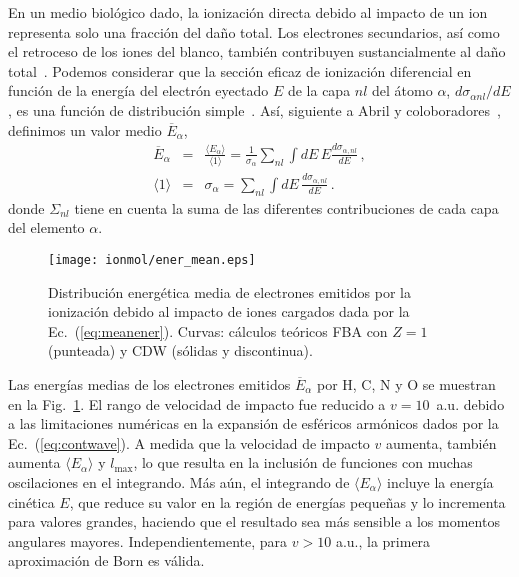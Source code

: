 En un medio biológico dado, la ionización directa debido al impacto de un 
ion representa solo una fracción del daño total. Los electrones 
secundarios, así como el retroceso de los iones del blanco, también 
contribuyen sustancialmente al daño total~\cite{Denifl:11}. Podemos 
considerar que la sección eficaz de ionización diferencial en función de 
la energía del electrón eyectado $E$ de la capa $nl$ del átomo $\alpha$,
$d\sigma_{\alpha nl}/dE$, es una función de distribución simple~\cite{Surdutovic:18}. Así, siguiente a Abril y 
coloboradores~\cite{Abril:15}, definimos un valor medio 
$\overline{E}_{\alpha}$, 
\begin{eqnarray}
\overline{E}_{\alpha} &=&\frac{\langle E_{\alpha}\rangle}{\langle
1\rangle}=\frac{1}{\sigma_{\alpha}}\sum\limits_{nl}\int dE\,E
\frac{d\sigma_{\alpha,nl}}{dE}\,,  
\label{eq:meanener} \\
\langle 1\rangle &=&\sigma_{\alpha}=\sum\limits_{nl}\int dE\,
\frac{d\sigma_{\alpha,nl}}{dE}\,. 
\label{eq:normener}
\end{eqnarray}
donde $\Sigma_{nl}$ tiene en cuenta la suma de las diferentes 
contribuciones de cada capa del elemento $\alpha$.

\begin{figure}
\centering
\texttt{[image: ionmol/ener\_mean.eps]}
\caption[Distribución energética media de electrones emitidos.]
{Distribución energética media de electrones emitidos por la ionización 
debido al impacto de iones cargados dada por la Ec.~(\ref{eq:meanener}). 
Curvas: cálculos teóricos FBA con $Z=1$ (punteada) y CDW (sólidas y 
discontinua).}
\label{fig:emittedener}
\end{figure} 

Las energías medias de los electrones emitidos $\overline{E}_{\alpha}$ 
por H, C, N y O se muestran en la Fig.~\ref{fig:emittedener}. El rango 
de velocidad de impacto fue reducido a $v=10$~a.u. debido a las 
limitaciones numéricas en la expansión de esféricos armónicos dados por 
la Ec.~(\ref{eq:contwave}). A medida que la velocidad de impacto $v$ 
aumenta, también aumenta $\langle E_{\alpha}\rangle$ y $l_{\max}$, lo que 
resulta en la inclusión de funciones con muchas oscilaciones en el 
integrando. Más aún, el integrando de $\langle E_{\alpha}\rangle$ incluye 
la energía cinética $E$, que reduce su valor en la región de energías 
pequeñas y lo incrementa para valores grandes, haciendo que el resultado 
sea más sensible a los momentos angulares mayores. Independientemente, 
para $v>10$ a.u., la primera aproximación de Born es válida. 

